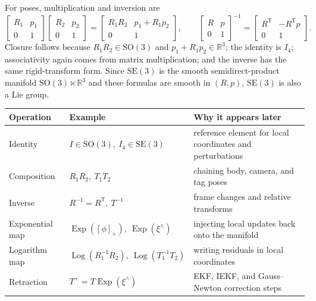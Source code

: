 \documentclass[11pt]{report}
\newcommand{\SO}{\mathrm{SO}(3)}
\newcommand{\SE}{\mathrm{SE}(3)}
\newcommand{\R}{\mathbb{R}}
\newcommand{\Exp}{\operatorname{Exp}}
\newcommand{\Log}{\operatorname{Log}}
\newcommand{\tran}{^{\mathsf T}}
\begin{document}
For poses, multiplication and inversion are
\begin{equation}
\begin{bmatrix}R_1&p_1\\0&1\end{bmatrix}
\begin{bmatrix}R_2&p_2\\0&1\end{bmatrix}
=
\begin{bmatrix}R_1R_2&p_1+R_1p_2\\0&1\end{bmatrix},
\qquad
\begin{bmatrix}R&p\\0&1\end{bmatrix}^{-1}
=
\begin{bmatrix}R\tran&-R\tran p\\0&1\end{bmatrix}.
\end{equation}
Closure follows because $R_1R_2\in\SO$ and $p_1+R_1p_2\in\R^3$; the identity is $I_4$; associativity again comes from matrix multiplication; and the inverse has the same rigid-transform form. Since $\SE$ is the smooth semidirect-product manifold $\SO\ltimes\R^3$ and these formulas are smooth in $(R,p)$, $\SE$ is also a Lie group.

\begin{center}
{\scriptsize
\setlength{\tabcolsep}{4pt}
\begin{tabular}{p{}p{}p{}}
\toprule
\textbf{Operation} & \textbf{Example} & \textbf{Why it appears later}\\
\midrule
Identity & $I\in\SO,\ I_4\in\SE$ & reference element for local coordinates and perturbations\\
Composition & $R_1R_2,\ T_1T_2$ & chaining body, camera, and tag poses\\
Inverse & $R^{-1}=R\tran,\ T^{-1}$ & frame changes and relative transforms\\
Exponential map & $\Exp([\phi]_\times),\ \Exp(\xi^\wedge)$ & injecting local updates back onto the manifold\\
Logarithm map & $\Log(R_1^{-1}R_2),\ \Log(T_1^{-1}T_2)$ & writing residuals in local coordinates\\
Retraction & $T^+=T\Exp(\xi^\wedge)$ & EKF, IEKF, and Gauss--Newton correction steps\\
\bottomrule
\end{tabular}}
\end{center}
\end{document}
